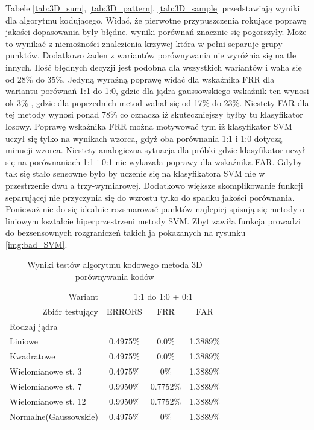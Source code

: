 Tabele \ref{tab:3D_sum}, \ref{tab:3D_pattern}, \ref{tab:3D_sample} przedstawiają wyniki dla algorytmu kodującego. Widać, że pierwotne przypuszczenia rokujące poprawę jakości dopasowania były błędne. wyniki porównań znacznie się pogorszyły. Może to wynikać z niemożności znalezienia krzywej która w pełni separuje grupy punktów. Dodatkowo żaden z wariantów porównywania nie wyróżnia się na tle innych. Ilość błędnych decyzji jest podobna dla wszystkich wariantów i waha się od 28\% do 35\%. Jedyną wyraźną poprawę widać dla wskaźnika FRR dla wariantu porównań 1:1 do 1:0, gdzie dla jądra gaussowskiego wskaźnik ten wynosi ok 3\% , gdzie dla poprzednich metod wahał się od 17\% do 23\%. Niestety FAR dla tej metody wynosi ponad 78\% co oznacza iż skuteczniejszy byłby tu klasyfikator losowy. Poprawę wskaźnika FRR można motywować tym iż klasyfikator SVM uczył się tylko na wynikach wzorca, gdyż oba porównania 1:1 i 1:0 dotyczą minucji wzorca. Niestety analogiczna sytuacja dla próbki gdzie klasyfikator uczył się na porównaniach 1:1 i 0:1 nie wykazała poprawy dla wskaźnika FAR. Gdyby tak się stało sensowne było by uczenie się na klasyfikatora SVM nie w przestrzenie dwu a trzy-wymiarowej. Dodatkowo większe skomplikowanie funkcji separującej nie przyczynia się do wzrostu tylko do spadku jakości porównania. Ponieważ nie do się idealnie rozsmarować punktów najlepiej spisują się metody o liniowym kształcie hiperprzestrzeni metody SVM. Zbyt zawiła funkcja prowadzi do bezsensownych rozgraniczeń takich ja pokazanych na rysunku \ref{img:bad_SVM}.

\begin{table}[!htb]
    \begin{tabular}{p{3cm}|r||c|c|c|}
	\cline{2-5}
    & Wariant & \multicolumn{3}{|c|}{1:1 do 1:0 + 0:1}\\ \cline{2-5} 
    & Zbiór testujący & ERRORS  & FRR & FAR\\ \hline
	\multicolumn{2}{|l||}{Rodzaj jądra} &  \multicolumn{3}{|c|}{}\\
	\hline\hline
    \multicolumn{2}{|l||}{Liniowe} & 0.4975\% & 0.0\% & 1.3889\%\\ \hline
    \multicolumn{2}{|l||}{Kwadratowe} & 0.4975\% & 0.0\% & 1.3889\%\\ \hline
    \multicolumn{2}{|l||}{Wielomianowe st. 3} &0.4975\% & 0\% & 1.3889\%\\ \hline
    \multicolumn{2}{|l||}{Wielomianowe st. 7} & 0.9950\% & 0.7752\% & 1.3889\%\\ \hline
    \multicolumn{2}{|l||}{Wielomianowe st. 12} & 0.9950\% & 0.7752\% & 1.3889\%\\ \hline
    \multicolumn{2}{|l||}{Normalne(Gaussowskie)} & 0.4975\% & 0\% & 1.3889\%\\ \hline
    \end{tabular}
	\caption{Wyniki testów algorytmu kodowego metoda 3D porównywania kodów}
	\label{tab:3D_sum_2}
    \end{table}
    
